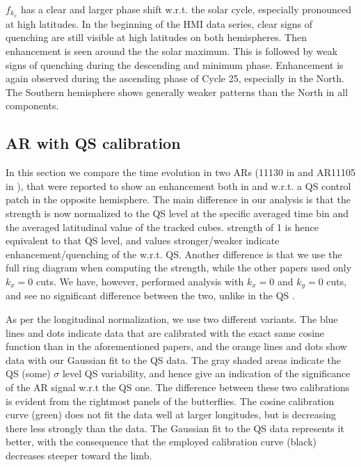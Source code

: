 \documentclass{aa}
\begin{document}
$f_{k_{x}}$ has a clear and larger phase shift w.r.t. the solar 
cycle, especially pronounced at high latitudes. In the beginning
of the HMI data series, clear signs of quenching are still
visible at high latitudes on both hemispheres. Then enhancement is 
seen around the the solar maximum. This is followed by weak signs
of quenching during the descending and minimum phase. Enhancement
is again observed during the ascending phase of Cycle 25, especially
in the North. The Southern hemisphere shows generally weaker
patterns than the North in all \fff components.


\subsection{AR \fff with QS calibration}\label{arf}

In this section we compare the \fff time evolution in 
two ARs (11130 in  and AR11105 in ), that were reported to show an enhancement both in \cite{SRB16} and \cite{Waidele22} w.r.t. a QS control patch
in the opposite hemisphere. The main difference in our analysis
is that the \fff strength is now normalized to the QS level
at the specific averaged time bin and the averaged latitudinal
value of the tracked cubes. 
\fff strength of 1 is hence
equivalent to that QS level, and values stronger/weaker 
indicate enhancement/quenching of the \fff w.r.t. QS.
Another difference is that we use the
full ring diagram when computing the \fff strength, while the
other papers used only $k_x=0$ cuts. We have, however, performed
analysis with $k_x=0$ and $k_y=0$ cuts, and see no significant
difference between the two, unlike in the QS \fff. 

As per the longitudinal normalization, we use two different
variants. The blue lines and dots indicate data that are
calibrated with the exact same cosine function than in the
aforementioned papers, and the orange lines and dots show
data with our Gaussian fit to the QS data. 
The gray shaded areas indicate the QS (some) $\sigma$ level
QS variability, and hence give an indication of the significance
of the AR signal w.r.t the QS one.
The difference between these two calibrations is evident from the
rightmost panels of the \fff butterflies. The cosine calibration
curve (green) does not fit the data well at larger longitudes,
but is decreasing there less strongly than the data. 
The Gaussian fit to the QS
data represents it better, with the consequence that the
employed calibration curve (black) decreases steeper toward the
limb. 
\end{document}
